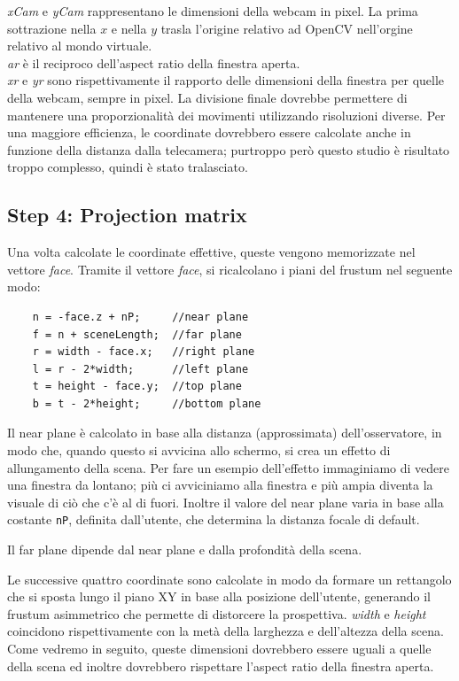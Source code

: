 \textit{xCam} e \textit{yCam} rappresentano le dimensioni della webcam in pixel. La prima sottrazione nella $x$ e nella $y$ trasla l'origine relativo ad OpenCV nell'orgine relativo al mondo virtuale.\\
\textit{ar} è il reciproco dell'aspect ratio della finestra aperta.\\
\textit{xr} e \textit{yr} sono rispettivamente il rapporto delle dimensioni della finestra per quelle della webcam, sempre in pixel. La divisione finale dovrebbe permettere di mantenere una proporzionalità dei movimenti utilizzando risoluzioni diverse. Per una maggiore efficienza, le coordinate dovrebbero essere calcolate anche in funzione della distanza dalla telecamera; purtroppo però questo studio è risultato troppo complesso, quindi è stato tralasciato.

\subsection*{Step 4: Projection matrix}
Una volta calcolate le coordinate effettive, queste vengono memorizzate nel vettore \textit{face}.
Tramite il vettore \textit{face}, si ricalcolano i piani del frustum nel seguente modo:
\begin{lstlisting}
    n = -face.z + nP;     //near plane
    f = n + sceneLength;  //far plane
    r = width - face.x;   //right plane
    l = r - 2*width;      //left plane
    t = height - face.y;  //top plane
    b = t - 2*height;     //bottom plane

\end{lstlisting}

Il near plane è calcolato in base alla distanza (approssimata) dell'osservatore, in modo che, quando questo si avvicina allo schermo, si crea un effetto di allungamento della scena. Per fare un esempio dell'effetto immaginiamo di vedere una finestra da lontano; più ci avviciniamo alla finestra e più ampia diventa la visuale di ciò che c'è al di fuori. Inoltre il valore del near plane varia in base alla costante \texttt{nP}, definita dall'utente, che determina la distanza focale di default.

Il far plane dipende dal near plane e dalla profondità della scena.

Le successive quattro coordinate sono calcolate in modo da formare un rettangolo che si sposta lungo il piano XY in base alla posizione dell'utente, generando il frustum asimmetrico che permette di distorcere la prospettiva. \textit{width} e \textit{height} coincidono rispettivamente con la metà della larghezza e dell'altezza della scena. Come vedremo in seguito, queste dimensioni dovrebbero essere uguali a quelle della scena ed inoltre dovrebbero rispettare l'aspect ratio della finestra aperta.

